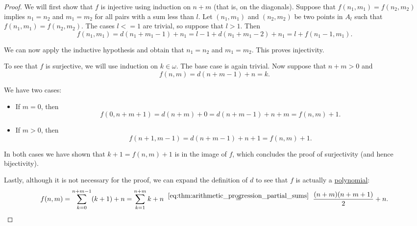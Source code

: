 \begin{proof}
  We will first show that \( f \) is injective using induction on \( n + m \) (that is, on the diagonals). Suppose that \( f(n_1, m_1) = f(n_2, m_2) \) implies \( n_1 = n_2 \) and \( m_1 = m_2 \) for all pairs with a sum less than \( l \). Let \( (n_1, m_1) \) and \( (n_2, m_2) \) be two points in \( A_l \) such that \( f(n_1, m_1) = f(n_2, m_2) \). The cases \( l <= 1 \) are trivial, so suppose that \( l > 1 \). Then
  \begin{equation*}
    f(n_1, m_1)
    =
    d(n_1 + m_1 - 1) + n_1
    =
    l - 1 + d(n_1 + m_1 - 2) + n_1
    =
    l + f(n_1 - 1, m_1).
  \end{equation*}

  We can now apply the inductive hypothesis and obtain that \( n_1 = n_2 \) and \( m_1 = m_2 \). This proves injectivity.

  To see that \( f \) is surjective, we will use induction on \( k \in \omega \). The base case is again trivial. Now suppose that \( n + m > 0 \) and
  \begin{equation*}
    f(n, m) = d(n + m - 1) + n = k.
  \end{equation*}

  We have two cases:
  \begin{itemize}
    \item If \( m = 0 \), then
    \begin{equation*}
      f(0, n + m + 1) = d(n + m) + 0 = d(n + m - 1) + n + m = f(n, m) + 1.
    \end{equation*}

    \item If \( m > 0 \), then
    \begin{equation*}
      f(n + 1, m - 1) = d(n + m - 1) + n + 1 = f(n, m) + 1.
    \end{equation*}
  \end{itemize}

  In both cases we have shown that \( k + 1 = f(n, m) + 1 \) is in the image of \( f \), which concludes the proof of surjectivity (and hence bijectivity).

  Lastly, although it is not necessary for the proof, we can expand the definition of \( d \) to see that \( f \) is actually a \hyperref[def:polynomial]{polynomial}:
  \begin{equation*}
    f(n, m)
    =
    \sum_{k=0}^{n + m - 1} (k + 1) + n
    =
    \sum_{k=1}^{n + m} k + n
    \reloset {\eqref{eq:thm:arithmetic_progression_partial_sums}} =
    \frac {(n + m) (n + m + 1)} 2 + n.
  \end{equation*}


\end{proof}
